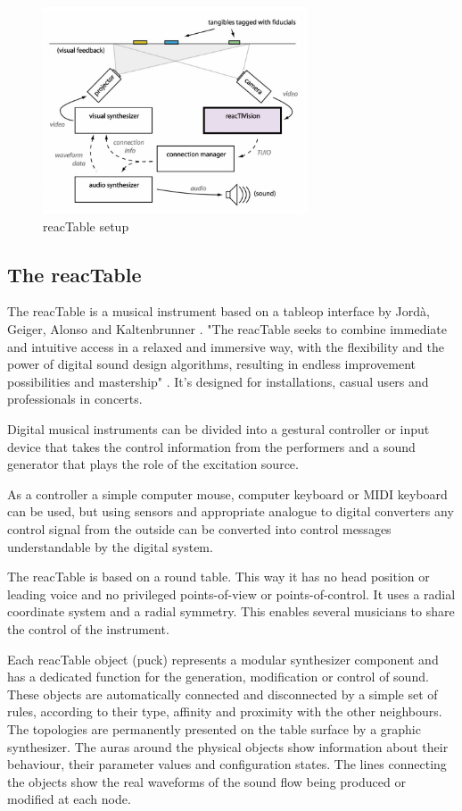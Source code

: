 \begin{figure}
\centering
\includegraphics[width=0.7\textwidth]{figures/reactable-setup.jpg}
\caption{reacTable setup}
\label{fig:reactablea}
\end{figure}

\subsection{The reacTable}

The reacTable is a musical instrument based on a tableop interface by Jord\`{a}, Geiger, Alonso and Kaltenbrunner \cite{jorda07}. "The reacTable seeks to combine immediate and intuitive access in a relaxed and immersive way, with the flexibility and the power of digital sound design algorithms, resulting in endless improvement possibilities and mastership" \cite{jorda07}. It's designed for installations, casual users and professionals in concerts. 

Digital musical instruments can be divided into a gestural controller or input device that takes the control information from the performers and a sound generator that plays the role of the excitation source. 

As a controller a simple computer mouse, computer keyboard or MIDI keyboard can be used, but using sensors and appropriate analogue to digital converters any control signal from the outside can be converted into control messages understandable by the digital system. 

The reacTable is based on a round table. This way it has no head position or leading voice and no privileged points-of-view or points-of-control. It uses a radial coordinate system and a radial symmetry. 
This enables several musicians to share the control of the instrument. 

Each reacTable object (puck) represents a modular synthesizer component and has a dedicated function for the generation, modification or control of sound. These objects are automatically connected and disconnected by a simple set of rules, according to their type, affinity and proximity with the other neighbours. The topologies are permanently presented on the table surface by a graphic synthesizer. The auras around the physical objects show information about their behaviour, their parameter values and configuration states. The lines connecting the objects show the real waveforms of the sound flow being produced or modified at each node. 



